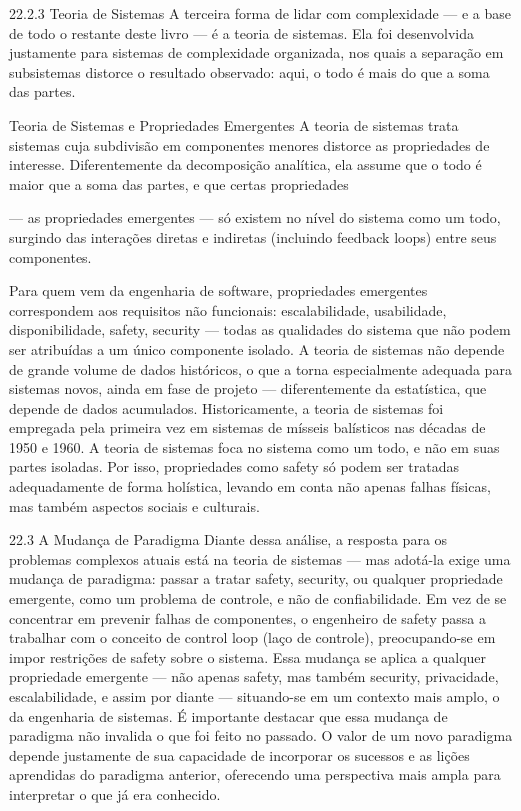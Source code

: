 22.2.3 Teoria de Sistemas A terceira forma de lidar com complexidade — e a base de todo o restante deste livro — é a teoria de sistemas. Ela foi desenvolvida justamente para sistemas de complexidade organizada, nos quais a separação em subsistemas distorce o resultado observado: aqui, o todo é mais do que a soma das partes.

Teoria de Sistemas e Propriedades Emergentes A teoria de sistemas trata sistemas cuja subdivisão em componentes menores distorce as propriedades de interesse. Diferentemente da decomposição analítica, ela assume que o todo é maior que a soma das partes, e que certas propriedades

— as propriedades emergentes — só existem no nível do sistema como um todo, surgindo das interações diretas e indiretas (incluindo feedback loops) entre seus componentes.

Para quem vem da engenharia de software, propriedades emergentes correspondem aos requisitos não funcionais: escalabilidade, usabilidade, disponibilidade, safety, security — todas as qualidades do sistema que não podem ser atribuídas a um único componente isolado. A teoria de sistemas não depende de grande volume de dados históricos, o que a torna especialmente adequada para sistemas novos, ainda em fase de projeto — diferentemente da estatística, que depende de dados acumulados. Historicamente, a teoria de sistemas foi empregada pela primeira vez em sistemas de mísseis balísticos nas décadas de 1950 e 1960. A teoria de sistemas foca no sistema como um todo, e não em suas partes isoladas. Por isso, propriedades como safety só podem ser tratadas adequadamente de forma holística, levando em conta não apenas falhas físicas, mas também aspectos sociais e culturais.

22.3 A Mudança de Paradigma Diante dessa análise, a resposta para os problemas complexos atuais está na teoria de sistemas — mas adotá-la exige uma mudança de paradigma: passar a tratar safety, security, ou qualquer propriedade emergente, como um problema de controle, e não de confiabilidade. Em vez de se concentrar em prevenir falhas de componentes, o engenheiro de safety passa a trabalhar com o conceito de control loop (laço de controle), preocupando-se em impor restrições de safety sobre o sistema. Essa mudança se aplica a qualquer propriedade emergente — não apenas safety, mas também security, privacidade, escalabilidade, e assim por diante — situando-se em um contexto mais amplo, o da engenharia de sistemas. É importante destacar que essa mudança de paradigma não invalida o que foi feito no passado. O valor de um novo paradigma depende justamente de sua capacidade de incorporar os sucessos e as lições aprendidas do paradigma anterior, oferecendo uma perspectiva mais ampla para interpretar o que já era conhecido.

